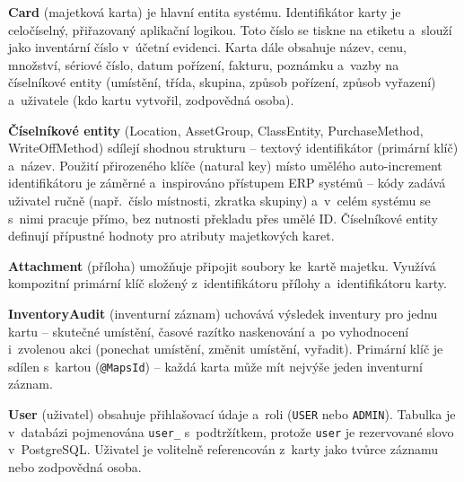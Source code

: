 \textbf{Card} (majetková karta) je hlavní entita systému. Identifikátor karty je celočíselný, přiřazovaný aplikační logikou. Toto číslo se tiskne na etiketu a~slouží jako inventární číslo v~účetní evidenci. Karta dále obsahuje název, cenu, množství, sériové číslo, datum pořízení, fakturu, poznámku a~vazby na číselníkové entity (umístění, třída, skupina, způsob pořízení, způsob vyřazení) a~uživatele (kdo kartu vytvořil, zodpovědná osoba).

\textbf{Číselníkové entity} (Location, AssetGroup, ClassEntity, PurchaseMethod, WriteOffMethod) sdílejí shodnou strukturu -- textový identifikátor (primární klíč) a~název. Použití přirozeného klíče (natural key) místo umělého auto-increment identifikátoru je záměrné a~inspirováno přístupem ERP systémů -- kódy zadává uživatel ručně (např.\ číslo místnosti, zkratka skupiny) a~v~celém systému se s~nimi pracuje přímo, bez nutnosti překladu přes umělé ID. Číselníkové entity definují přípustné hodnoty pro atributy majetkových karet.

\textbf{Attachment} (příloha) umožňuje připojit soubory ke~kartě majetku. Využívá kompozitní primární klíč složený z~identifikátoru přílohy a~identifikátoru karty.

\textbf{InventoryAudit} (inventurní záznam) uchovává výsledek inventury pro jednu kartu -- skutečné umístění, časové razítko naskenování a~po vyhodnocení i~zvolenou akci (ponechat umístění, změnit umístění, vyřadit). Primární klíč je sdílen s~kartou (\texttt{@MapsId}) -- každá karta může mít nejvýše jeden inventurní záznam.

\textbf{User} (uživatel) obsahuje přihlašovací údaje a~roli (\texttt{USER} nebo \texttt{ADMIN}). Tabulka je v~databázi pojmenována \texttt{user\_} s~podtržítkem, protože \texttt{user} je rezervované slovo v~PostgreSQL. Uživatel je volitelně referencován z~karty jako tvůrce záznamu nebo zodpovědná osoba.


